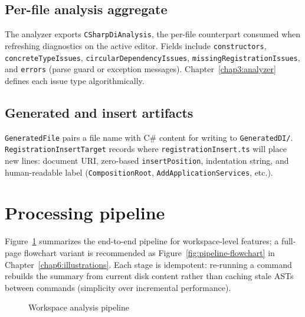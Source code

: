 \subsection{Per-file analysis aggregate}

The analyzer exports \texttt{CSharpDiAnalysis}, the per-file counterpart consumed when refreshing diagnostics on the active editor. Fields include \texttt{constructors}, \texttt{concreteTypeIssues}, \texttt{circularDependencyIssues}, \texttt{missingRegistrationIssues}, and \texttt{errors} (parse guard or exception messages). Chapter~\ref{chap3:analyzer} defines each issue type algorithmically.

\subsection{Generated and insert artifacts}

\texttt{GeneratedFile} pairs a file name with C\# content for writing to \texttt{GeneratedDI/}. \texttt{RegistrationInsertTarget} records where \texttt{registrationInsert.ts} will place new lines: document URI, zero-based \texttt{insertPosition}, indentation string, and human-readable label (\texttt{CompositionRoot}, \texttt{AddApplicationServices}, etc.).

\section{Processing pipeline}
\label{chap2:pipeline}

Figure~\ref{fig:pipeline} summarizes the end-to-end pipeline for workspace-level features; a full-page flowchart variant is recommended as Figure~\ref{fig:pipeline-flowchart} in Chapter~\ref{chap6:illustrations}. Each stage is idempotent: re-running a command rebuilds the summary from current disk content rather than caching stale ASTs between commands (simplicity over incremental performance).

\begin{figure}[htbp]
\centering
{}
\caption{Workspace analysis pipeline}
\label{fig:pipeline}
\end{figure}

